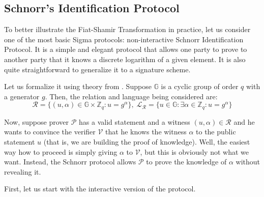 \documentclass[../lecture-notes-148x210.tex]{subfiles}
\begin{document}
\subsection{Schnorr's Identification Protocol}

To better illustrate the Fiat-Shamir Transformation in practice, let us consider one of the most basic Sigma protocols: non-interactive Schnorr Identification Protocol. It is a simple and elegant protocol that allows one party to prove to another party that it knows a discrete logarithm of a given element. It is also quite straightforward to generalize it to a signature scheme.

Let us formalize it using theory from . Suppose $\mathbb{G}$ is a cyclic group of order $q$ with a generator $g$. Then, the relation and language being considered are:
\begin{equation*}
    \mathcal{R} = \{(u, \alpha) \in \mathbb{G} \times \mathbb{Z}_q: u = g^{\alpha}\}, \; \mathcal{L}_{\mathcal{R}} = \{u \in \mathbb{G}: \exists \alpha \in \mathbb{Z}_q: u = g^{\alpha}\}
\end{equation*}

Now, suppose prover $\mathcal{P}$ has a valid statement and a witness $(u,\alpha) \in \mathcal{R}$ and he wants to convince the verifier $\mathcal{V}$ that he knows the witness $\alpha$ to the public statement $u$ (that is, we are building the proof of knowledge). Well, the easiest way how to proceed is simply giving $\alpha$ to $\mathcal{V}$, but this is obviously not what we want. Instead, the Schnorr protocol allows $\mathcal{P}$ to prove the knowledge of $\alpha$ without revealing it. 

First, let us start with the interactive version of the protocol. 
\end{document}
